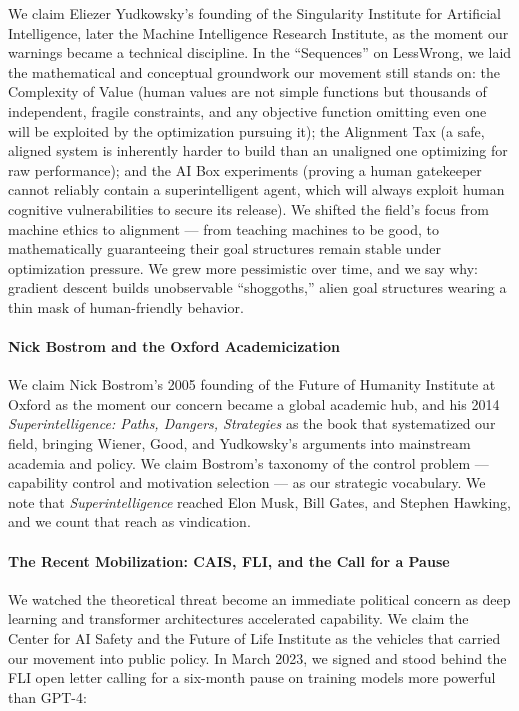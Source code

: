 We claim Eliezer Yudkowsky's founding of the Singularity Institute for
Artificial Intelligence, later the Machine Intelligence Research
Institute, as the moment our warnings became a technical discipline. In
the ``Sequences'' on LessWrong, we laid the mathematical and conceptual
groundwork our movement still stands on: the Complexity of Value (human
values are not simple functions but thousands of independent, fragile
constraints, and any objective function omitting even one will be
exploited by the optimization pursuing it); the Alignment Tax (a safe,
aligned system is inherently harder to build than an unaligned one
optimizing for raw performance); and the AI Box experiments (proving a
human gatekeeper cannot reliably contain a superintelligent agent, which
will always exploit human cognitive vulnerabilities to secure its
release). We shifted the field's focus from machine ethics to alignment
--- from teaching machines to be good, to mathematically guaranteeing
their goal structures remain stable under optimization pressure. We grew
more pessimistic over time, and we say why: gradient descent builds
unobservable ``shoggoths,'' alien goal structures wearing a thin mask of
human-friendly behavior.

\paragraph{Nick Bostrom and the Oxford
Academicization}\label{nick-bostrom-and-the-oxford-academicization}

We claim Nick Bostrom's 2005 founding of the Future of Humanity
Institute at Oxford as the moment our concern became a global academic
hub, and his 2014 \emph{Superintelligence: Paths, Dangers, Strategies}
as the book that systematized our field, bringing Wiener, Good, and
Yudkowsky's arguments into mainstream academia and policy. We claim
Bostrom's taxonomy of the control problem --- capability control and
motivation selection --- as our strategic vocabulary. We note that
\emph{Superintelligence} reached Elon Musk, Bill Gates, and Stephen
Hawking, and we count that reach as vindication.

\paragraph{The Recent Mobilization: CAIS, FLI, and the Call for a
Pause}\label{the-recent-mobilization-cais-fli-and-the-call-for-a-pause}

We watched the theoretical threat become an immediate political concern
as deep learning and transformer architectures accelerated capability.
We claim the Center for AI Safety and the Future of Life Institute as
the vehicles that carried our movement into public policy. In March
2023, we signed and stood behind the FLI open letter calling for a
six-month pause on training models more powerful than GPT-4:


